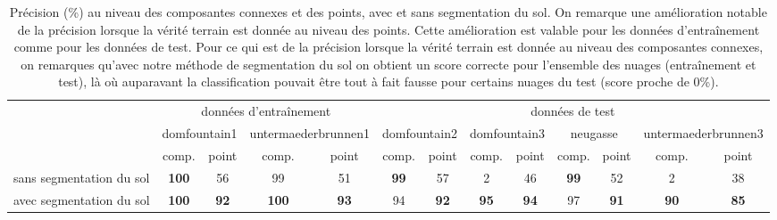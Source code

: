 \begin{table}[h]
\tiny
\begin{tabular}{l|c|c|c|c|c|c|c|c|c|c|c|c|}
\cline{2-13}
                                               & \multicolumn{4}{c|}{données d'entraînement}                                  & \multicolumn{8}{c|}{données de test}                                                                                                             \\ \cline{2-13} 
                                               & \multicolumn{2}{c|}{domfountain1} & \multicolumn{2}{c|}{untermaederbrunnen1} & \multicolumn{2}{c|}{domfountain2} & \multicolumn{2}{c|}{domfountain3} & \multicolumn{2}{c|}{neugasse} & \multicolumn{2}{c|}{untermaederbrunnen3} \\ \cline{2-13} 
                                               & comp.            & point          & comp.               & point              & comp.           & point           & comp.           & point           & comp.         & point         & comp.               & point              \\ \hline
\multicolumn{1}{|l|}{sans segmentation du sol} & \textbf{100}     & 56             & 99                  & 51                 & \textbf{99}     & 57              & 2               & 46              & \textbf{99}   & 52            & 2                   & 38                 \\ \hline
\multicolumn{1}{|l|}{avec segmentation du sol} & \textbf{100}     & \textbf{92}    & \textbf{100}        & \textbf{93}        & 94              & \textbf{92}     & \textbf{95}     & \textbf{94}     & 97            & \textbf{91}   & \textbf{90}         & \textbf{85}        \\ \hline
\end{tabular}
\caption{Précision (\%) au niveau des composantes connexes et des points, avec et sans segmentation du sol. On remarque une amélioration notable de la précision lorsque la vérité terrain est donnée au niveau des points. Cette amélioration est valable pour les données d'entraînement comme pour les données de test. Pour ce qui est de la précision lorsque la vérité terrain est donnée au niveau des composantes connexes, on remarques qu'avec notre méthode de segmentation du sol on obtient un score correcte pour l'ensemble des nuages (entraînement et test), là où auparavant la classification pouvait être tout à fait fausse pour certains nuages du test (score proche de $0$\%).}
\label{table:ground}
\end{table}